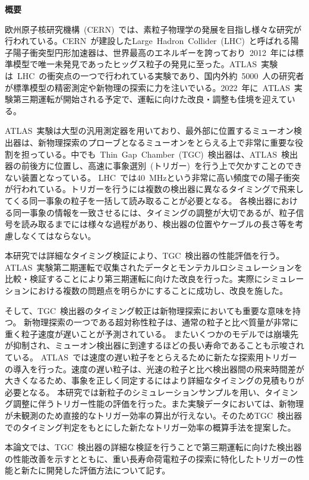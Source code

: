 \begin{center}
    \textbf{概要}
\end{center}
\thispagestyle{empty}
\vspace{10pt}
欧州原子核研究機構~(CERN)~では、素粒子物理学の発展を目指し様々な研究が行われている。CERN~が建設したLarge~Hadron~Collider~(LHC)~と呼ばれる陽子陽子衝突型円形加速器は、世界最高のエネルギーを誇っており~2012~年には標準模型で唯一未発見であったヒッグス粒子の発見に至った。ATLAS~実験は~LHC~の衝突点の一つで行われている実験であり、国内外約~5000~人の研究者が標準模型の精密測定や新物理の探索に力を注いでいる。2022~年に~ATLAS~実験第三期運転が開始される予定で、運転に向けた改良・調整も佳境を迎えている。

ATLAS~実験は大型の汎用測定器を用いており、最外部に位置するミューオン検出器は、新物理探索のプローブとなるミューオンをとらえる上で非常に重要な役割を担っている。中でも~Thin~Gap~Chamber~(TGC)~検出器は、ATLAS~検出器の前後方に位置し、高速に事象選別~(トリガー)~を行う上で欠かすことのできない装置となっている。
LHC~では40~MHzという非常に高い頻度での陽子衝突が行われている。トリガーを行うには複数の検出器に異なるタイミングで飛来してくる同一事象の粒子を一括して読み取ることが必要となる。
各検出器における同一事象の情報を一致させるには、タイミングの調整が大切であるが、粒子信号を読み取るまでには様々な過程があり、検出器の位置やケーブルの長さ等を考慮しなくてはならない。

本研究では詳細なタイミング検証により、TGC~検出器の性能評価を行う。ATLAS~実験第二期運転で収集されたデータとモンテカルロシミュレーションを比較・検証することにより第三期運転に向けた改良を行った。実際にシミュレーションにおける複数の問題点を明らかにすることに成功し、改良を施した。

そして、TGC~検出器のタイミング較正は新物理探索においても重要な意味を持つ。
新物理探索の一つである超対称性粒子は、通常の粒子と比べ質量が非常に重く粒子速度が遅いことが予測されている。
またいくつかのモデルでは崩壊先が抑制され、ミューオン検出器に到達するほどの長い寿命であることも示唆されている。
ATLAS~では速度の遅い粒子をとらえるために新たな探索用トリガーの導入を行った。速度の遅い粒子は、光速の粒子と比べ検出器間の飛来時間差が大きくなるため、事象を正しく同定するにはより詳細なタイミングの見積もりが必要となる。
本研究では新粒子のシミュレーションサンプルを用い、タイミング調整に伴うトリガー性能の評価を行った。また実験データにおいては、新物理が未観測のため直接的なトリガー効率の算出が行えない。そのためTGC~検出器でのタイミング判定をもとにした新たなトリガー効率の概算手法を提案した。

本論文では、TGC~検出器の詳細な検証を行うことで第三期運転に向けた検出器の性能改善を示すとともに、重い長寿命荷電粒子の探索に特化したトリガーの性能と新たに開発した評価方法について記す。